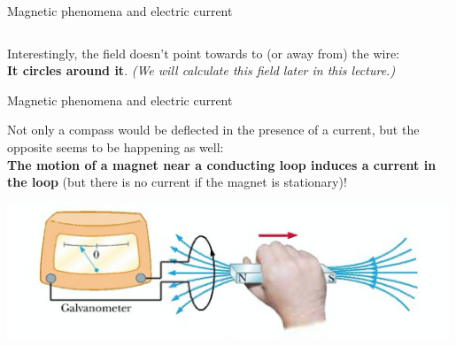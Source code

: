 \begin{frame}{Magnetic phenomena and electric current}
\begin{columns}
\begin{column}{0.50\textwidth}
\begin{center}
    \end{center}
  \end{column}
\end{columns}

\vspace{0.1cm}
Interestingly, the field doesn't point towards to (or away from) the wire:\\
{\bf It circles around it}. {\it (We will calculate this field later in this lecture.)}\\

\end{frame}


%
%
%

\begin{frame}{Magnetic phenomena and electric current}

Not only a compass would be deflected in the presence of a current,
but the opposite seems to be happening as well:\\
\vspace{0.3cm}
{\bf The motion of a magnet near a conducting loop induces a current in the loop}
(but there is no current if the magnet is stationary)!

\begin{center}
 \includegraphics[width=0.99\textwidth]{./images/schematics/magnetic_field_induces_current_in_conducting_loop.png}
\end{center}

\end{frame}

%
%
%

